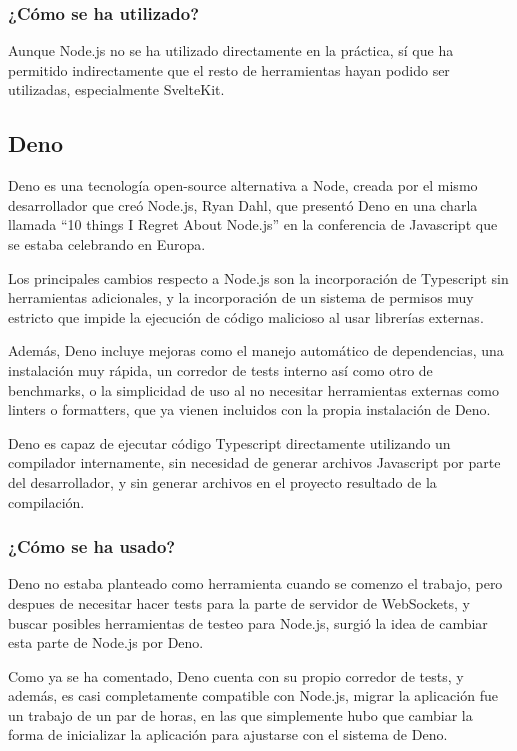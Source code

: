 \subsubsection{¿Cómo se ha utilizado?}
Aunque Node.js no se ha utilizado directamente en la práctica, sí que ha permitido indirectamente que el resto de herramientas hayan podido ser utilizadas, especialmente SvelteKit.


\subsection{Deno}
Deno es una tecnología open-source alternativa a Node, creada por el mismo desarrollador que creó Node.js, Ryan Dahl, que presentó Deno en una charla llamada “10 things I Regret About Node.js” en la conferencia de Javascript que se estaba celebrando en Europa.

Los principales cambios respecto a Node.js son la incorporación de Typescript sin herramientas adicionales, y la incorporación de un sistema de permisos muy estricto que impide la ejecución de código malicioso al usar librerías externas.

Además, Deno incluye mejoras como el manejo automático de dependencias, una instalación muy rápida, un corredor de tests interno así como otro de benchmarks, o la simplicidad de uso al no necesitar herramientas externas como linters o formatters, que ya vienen incluidos con la propia instalación de Deno.

Deno es capaz de ejecutar código Typescript directamente utilizando un compilador internamente, sin necesidad de generar archivos Javascript por parte del desarrollador, y sin generar archivos en el proyecto resultado de la compilación.

\subsubsection{¿Cómo se ha usado?}
Deno no estaba planteado como herramienta cuando se comenzo el trabajo, pero despues de necesitar hacer tests para la parte de servidor de WebSockets, y buscar posibles herramientas de testeo para Node.js, surgió la idea de cambiar esta parte de Node.js por Deno.

Como ya se ha comentado, Deno cuenta con su propio corredor de tests, y además, es casi completamente compatible con Node.js, migrar la aplicación fue un trabajo de un par de horas, en las que simplemente hubo que cambiar la forma de inicializar la aplicación para ajustarse con el sistema de Deno.

